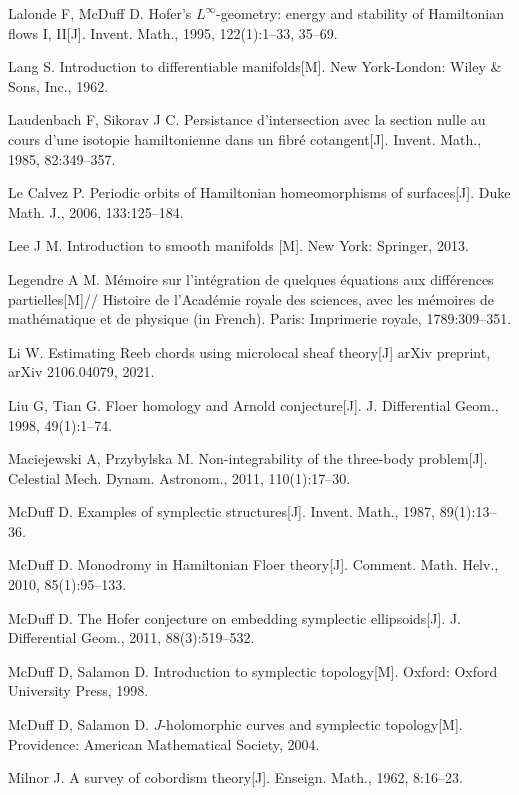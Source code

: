 \begin{enumerate}[label={[\arabic*]},leftmargin=3.2em,itemsep=2pt,parsep=0pt]
  \item Lalonde F, McDuff D. Hofer's $L^\infty$-geometry: energy and stability of
        Hamiltonian flows I, II[J]. Invent. Math., 1995, 122(1):1--33, 35--69.
  \item Lang S. Introduction to differentiable manifolds[M]. New York-London:
        Wiley \& Sons, Inc., 1962.
  \item Laudenbach F, Sikorav J C. Persistance d'intersection avec la section nulle au cours
        d'une isotopie hamiltonienne dans un fibré cotangent[J]. Invent. Math., 1985,
        82:349--357.
  \item Le Calvez P. Periodic orbits of Hamiltonian homeomorphisms of surfaces[J]. Duke
        Math. J., 2006, 133:125--184.
  \item Lee J M. Introduction to smooth manifolds [M]. New York: Springer, 2013.
  \item Legendre A M. Mémoire sur l'intégration de quelques équations aux différences
        partielles[M]// Histoire de l'Académie royale des sciences, avec les mémoires de
        mathématique et de physique (in French). Paris: Imprimerie royale, 1789:309--351.
  \item Li W. Estimating Reeb chords using microlocal sheaf theory[J] arXiv preprint,
        arXiv 2106.04079, 2021.
  \item Liu G, Tian G. Floer homology and Arnold conjecture[J]. J. Differential Geom., 1998,
        49(1):1--74.
  \item Maciejewski A, Przybylska M. Non-integrability of the three-body problem[J].
        Celestial Mech. Dynam. Astronom., 2011, 110(1):17--30.
  \item McDuff D. Examples of symplectic structures[J]. Invent. Math., 1987, 89(1):13--36.
  \item McDuff D. Monodromy in Hamiltonian Floer theory[J]. Comment. Math. Helv., 2010,
        85(1):95--133.
  \item McDuff D. The Hofer conjecture on embedding symplectic ellipsoids[J]. J. Differential
        Geom., 2011, 88(3):519--532.
  \item McDuff D, Salamon D. Introduction to symplectic topology[M]. Oxford: Oxford
        University Press, 1998.
  \item McDuff D, Salamon D. $J$-holomorphic curves and symplectic topology[M]. Providence:
        American Mathematical Society, 2004.
  \item Milnor J. A survey of cobordism theory[J]. Enseign. Math., 1962, 8:16--23.

\end{enumerate}
